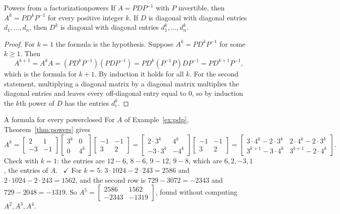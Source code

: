 \documentclass[11pt]{article}
\begin{document}
\begin{thm}{Powers from a factorization}{powers}
If $A=PDP^{-1}$ with $P$ invertible, then $A^k=PD^kP^{-1}$ for every positive integer $k$. If $D$ is diagonal with diagonal entries $d_1,\dots,d_n$, then $D^k$ is diagonal with diagonal entries $d_1^k,\dots,d_n^k$.
\end{thm}

\begin{proof}
For $k=1$ the formula is the hypothesis. Suppose $A^{k}=PD^{k}P^{-1}$ for some $k\ge1$. Then
\[
A^{k+1}=A^{k}A=(PD^{k}P^{-1})(PDP^{-1})=PD^{k}(P^{-1}P)DP^{-1}=PD^{k+1}P^{-1},
\]
which is the formula for $k+1$. By induction it holds for all $k$. For the second statement, multiplying a diagonal matrix by a diagonal matrix multiplies the diagonal entries and leaves every off-diagonal entry equal to $0$, so by induction the $k$th power of $D$ has the entries $d_i^k$.
\end{proof}

\begin{exmp}{A formula for every power}{closed}
For $A$ of Example~\ref{ex:pdp}, Theorem~\ref{thm:powers} gives
\[
A^k=\begin{bmatrix}2&1\\-3&-1\end{bmatrix}\begin{bmatrix}3^k&0\\0&4^k\end{bmatrix}\begin{bmatrix}-1&-1\\3&2\end{bmatrix}=\begin{bmatrix}2\cdot3^k&4^k\\-3\cdot3^k&-4^k\end{bmatrix}\begin{bmatrix}-1&-1\\3&2\end{bmatrix}=\begin{bmatrix}3\cdot4^k-2\cdot3^k&2\cdot4^k-2\cdot3^k\\3^{k+1}-3\cdot4^k&3^{k+1}-2\cdot4^k\end{bmatrix}.
\]
Check with $k=1$: the entries are $12-6$, $8-6$, $9-12$, $9-8$, which are $6,2,-3,1$, the entries of $A$. \ $\checkmark$ For $k=5$: $3\cdot1024-2\cdot243=2586$ and $2\cdot1024-2\cdot243=1562$, and the second row is $729-3072=-2343$ and $729-2048=-1319$. So $A^5=\begin{bmatrix}2586&1562\\-2343&-1319\end{bmatrix}$, found without computing $A^2,A^3,A^4$.
\end{exmp}
\end{document}
